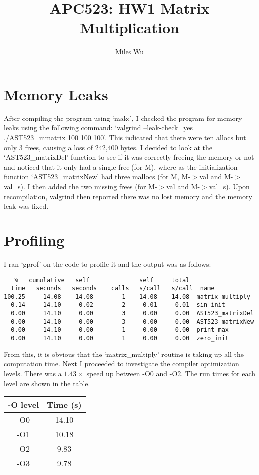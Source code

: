 \documentclass[12pt]{article}
\begin{document}
\title{APC523: HW1 Matrix Multiplication}
\author{Miles Wu}
\maketitle

\section{Memory Leaks}
After compiling the program using `make', I checked the program for memory leaks using the following command: `valgrind --leak-check=yes ./AST523\_mmatrix 100 100 100'. This indicated that there were ten allocs but only 3 frees, causing a loss of 242,400 bytes. I decided to look at the `AST523\_matrixDel' function to see if it was correctly freeing the memory or not and noticed that it only had a single free (for M), where as the initialization function `AST523\_matrixNew' had three mallocs (for M, M-$>$val and M-$>$val\_s). I then added the two missing frees (for M-$>$val and M-$>$val\_s). Upon recompilation, valgrind then reported there was no lost memory and the memory leak was fixed.

\section{Profiling}
I ran `gprof' on the code to profile it and the output was as follows:
\begin{verbatim}
   %   cumulative   self              self     total
  time   seconds   seconds    calls   s/call   s/call  name
100.25     14.08    14.08        1    14.08    14.08  matrix_multiply
  0.14     14.10     0.02        2     0.01     0.01  sin_init
  0.00     14.10     0.00        3     0.00     0.00  AST523_matrixDel
  0.00     14.10     0.00        3     0.00     0.00  AST523_matrixNew
  0.00     14.10     0.00        1     0.00     0.00  print_max
  0.00     14.10     0.00        1     0.00     0.00  zero_init
\end{verbatim}

From this, it is obvious that the `matrix\_multiply' routine is taking up all the computation time. Next I proceeded to investigate the compiler optimization levels. There was a $1.43\times$ speed up between -O0 and -O2. The run times for each level are shown in the table.

\begin{center}
\begin{tabular}{ | c | c | }
  \hline
  -O level & Time (s) \\
  \hline
  -O0 & 14.10 \\
  -O1 & 10.18 \\
  -O2 & 9.83 \\
  -O3 & 9.78 \\
  \hline
\end{tabular}
\end{center}
\end{document}
